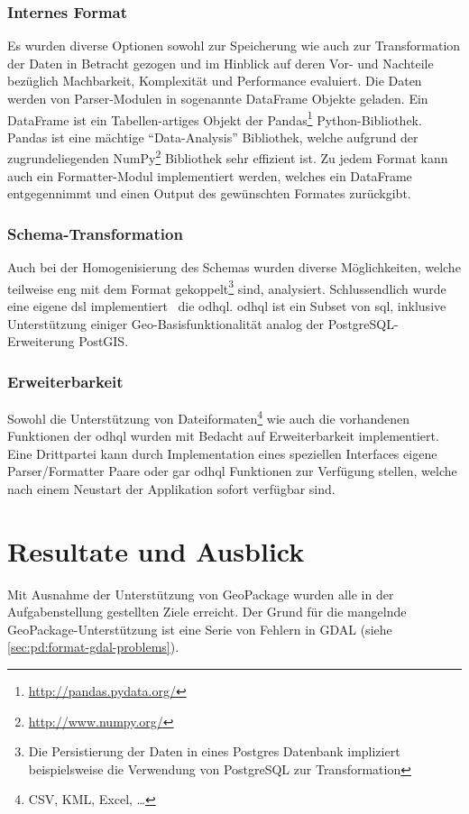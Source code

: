\subsection{Internes Format}
Es wurden diverse Optionen sowohl zur Speicherung wie auch zur Transformation der Daten in Betracht gezogen und im Hinblick auf deren Vor- und Nachteile bezüglich Machbarkeit, Komplexität und Performance evaluiert. Die Daten werden von Parser-Modulen in sogenannte DataFrame Objekte geladen. Ein DataFrame ist ein Tabellen-artiges Objekt der Pandas\footnote{\url{http://pandas.pydata.org/}} Python-Bibliothek. Pandas ist eine mächtige ``Data-Analysis'' Bibliothek, welche aufgrund der zugrundeliegenden NumPy\footnote{\url{http://www.numpy.org/}} Bibliothek sehr effizient ist.
Zu jedem Format kann auch ein Formatter-Modul implementiert werden, welches ein DataFrame entgegennimmt und einen Output des gewünschten Formates zurückgibt.

\subsection{Schema-Transformation}
Auch bei der Homogenisierung des Schemas wurden diverse Möglichkeiten, welche teilweise eng mit dem Format gekoppelt\footnote{Die Persistierung der Daten in eines Postgres Datenbank impliziert beispielsweise die Verwendung von PostgreSQL zur Transformation} sind, analysiert. Schlussendlich wurde eine eigene \gls{dsl} implementiert \textendash\ die \acf{odhql}. \acs{odhql} ist ein Subset von \acs{sql}, inklusive Unterstützung einiger Geo-Basisfunktionalität analog der PostgreSQL-Erweiterung PostGIS.

\subsection{Erweiterbarkeit}
Sowohl die Unterstützung von Dateiformaten\footnote{CSV, KML, Excel, \dots} wie auch die vorhandenen Funktionen der \acf{odhql} wurden mit Bedacht auf Erweiterbarkeit implementiert. Eine Drittpartei kann durch Implementation eines speziellen Interfaces eigene Parser/Formatter Paare oder gar \gls{odhql} Funktionen zur Verfügung stellen, welche nach einem Neustart der Applikation sofort verfügbar sind.


\chapter{Resultate und Ausblick} \label{sec:tb:results}
Mit Ausnahme der Unterstützung von GeoPackage wurden alle in der Aufgabenstellung gestellten Ziele erreicht. Der Grund für die mangelnde GeoPackage-Unterstützung ist eine Serie von Fehlern in GDAL (siehe \cref{sec:pd:format-gdal-problems}).

